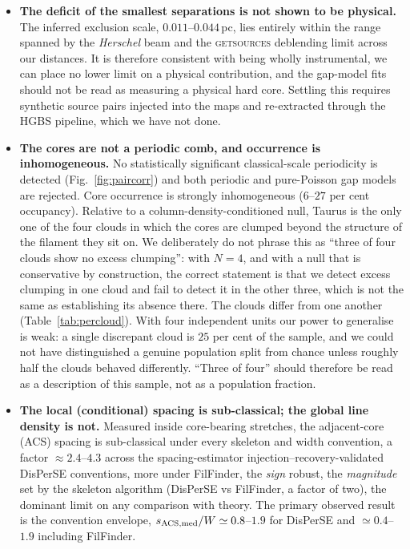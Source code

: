 \documentclass[usenatbib,twoside,twocolumn]{mnras}
\begin{document}
\begin{itemize}
    \item \textbf{The deficit of the smallest separations is not shown to be physical.} The inferred exclusion scale, $0.011$--$0.044$\,pc, lies entirely within the range spanned by the \textit{Herschel} beam and the \textsc{getsources} deblending limit across our distances. It is therefore consistent with being wholly instrumental, we can place no lower limit on a physical contribution, and the gap-model fits should not be read as measuring a physical hard core. Settling this requires synthetic source pairs injected into the maps and re-extracted through the HGBS pipeline, which we have not done.

    \item \textbf{The cores are not a periodic comb, and occurrence is inhomogeneous.} No statistically significant classical-scale periodicity is detected (Fig.~\ref{fig:paircorr}) and both periodic and pure-Poisson gap models are rejected. Core occurrence is strongly inhomogeneous ($6$--$27$ per cent occupancy). Relative to a column-density-conditioned null, Taurus is the only one of the four clouds in which the cores are clumped beyond the structure of the filament they sit on. We deliberately do not phrase this as ``three of four clouds show no excess clumping'': with $N=4$, and with a null that is conservative by construction, the correct statement is that we detect excess clumping in one cloud and fail to detect it in the other three, which is not the same as establishing its absence there. The clouds differ from one another (Table~\ref{tab:percloud}). With four independent units our power to generalise is weak: a single discrepant cloud is $25$ per cent of the sample, and we could not have distinguished a genuine population split from chance unless roughly half the clouds behaved differently. ``Three of four'' should therefore be read as a description of this sample, not as a population fraction.
    \item \textbf{The local (conditional) spacing is sub-classical; the global line density is not.} Measured inside core-bearing stretches, the adjacent-core (ACS) spacing is sub-classical under every skeleton and width convention, a factor $\approx2.4$--$4.3$ across the spacing-estimator injection--recovery-validated DisPerSE conventions, more under FilFinder, the \emph{sign} robust, the \emph{magnitude} set by the skeleton algorithm (DisPerSE vs FilFinder, a factor of two), the dominant limit on any comparison with theory. The primary observed result is the convention envelope, $s_{\rm ACS,med}/W\simeq0.8$--$1.9$ for DisPerSE and $\simeq0.4$--$1.9$ including FilFinder.

\end{itemize}
\end{document}
